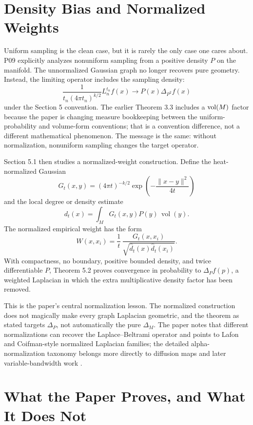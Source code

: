 \documentclass[11pt]{article}
\begin{document}
\section{Density Bias and Normalized Weights}

Uniform sampling is the clean case, but it is rarely the only case one cares
about. P09 explicitly analyzes nonuniform sampling from a positive density
\(P\) on the manifold. The unnormalized Gaussian graph no longer recovers
pure geometry. Instead, the limiting operator includes the sampling density:
\[
  \frac{1}{t_n(4\pi t_n)^{k/2}}L_n^{t_n}f(x)
  \longrightarrow
  P(x)\Delta_{P^2}f(x)
\]
under the Section 5 convention. The earlier Theorem 3.3 includes a
\(\operatorname{vol}(M)\) factor because the paper is changing measure bookkeeping between
the uniform-probability and volume-form conventions; that is a convention
difference, not a different mathematical phenomenon. The message is the same:
without normalization, nonuniform sampling changes the target operator.

Section 5.1 then studies a normalized-weight construction. Define the
heat-normalized Gaussian
\[
  G_t(x,y)=(4\pi t)^{-k/2}
  \exp\!\left(-\frac{\|x-y\|^2}{4t}\right)
\]
and the local degree or density estimate
\[
  d_t(x)=\int_M G_t(x,y)P(y)\,\operatorname{vol}(y).
\]
The normalized empirical weight has the form
\[
  W(x,x_i)
  =
  \frac{1}{t}\,
  \frac{G_t(x,x_i)}
       {\sqrt{\widehat d_t(x)\widehat d_t(x_i)}}.
\]
With compactness, no boundary, positive bounded density, and twice
differentiable \(P\), Theorem 5.2 proves convergence in probability to
\(\Delta_P f(p)\), a weighted Laplacian in which the extra multiplicative
density factor has been removed.

This is the paper's central normalization lesson. The normalized construction
does not magically make every graph Laplacian geometric, and the theorem as
stated targets \(\Delta_P\), not automatically the pure \(\Delta_M\). The
paper notes that different normalizations can recover the Laplace--Beltrami
operator and points to Lafon and Coifman-style normalized Laplacian families;
the detailed alpha-normalization taxonomy belongs more directly to diffusion
maps and later variable-bandwidth work \citep{coifman2006diffusion,berry2016variable}.

\section{What the Paper Proves, and What It Does Not}
\end{document}
